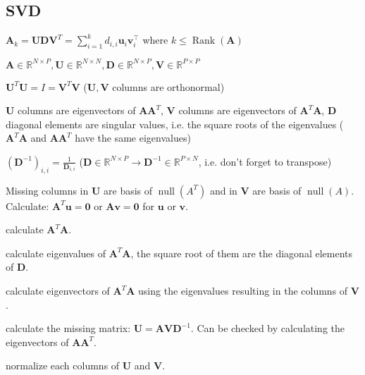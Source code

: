 \documentclass[a4paper, 11pt, landscape]{article}
\begin{document}
\begin{multicols*}{3}
\section{SVD}
\begin{compactitem}
	\item $\mathbf{A}_k = \mathbf{U} \mathbf{D} \mathbf{V}^T = \sum_{i=1}^{k} d_{i,i} \mathbf{u}_i \mathbf{v}_i^\top$ where $k \leq \operatorname{Rank}(\mathbf{A})$
	\item $\mathbf{A} \in \mathbb{R}^{N \times P}, \mathbf{U} \in \mathbb{R}^{N \times N}, \mathbf{D} \in \mathbb{R}^{N \times P}, \mathbf{V} \in \mathbb{R}^{P \times P}$
	\item $\mathbf{U}^T \mathbf{U} = I = \mathbf{V}^T \mathbf{V}$ ($\mathbf{U}, \mathbf{V}$ columns are orthonormal)
	\item $\mathbf{U}$ columns are eigenvectors of $\mathbf{A} \mathbf{A}^T$, $\mathbf{V}$ columns are eigenvectors of $\mathbf{A}^T \mathbf{A}$, $\mathbf{D}$ diagonal elements are singular values, i.e. the square roots of the eigenvalues ($\mathbf{A}^T \mathbf{A}$ and $\mathbf{A} \mathbf{A}^T$ have the same eigenvalues)
	\item $(\mathbf{D}^{-1})_{i,i} = \frac{1}{\mathbf{D}_{i, i}}$ ($\mathbf{D} \in \mathbb{R}^{N \times P} \to \mathbf{D}^{-1} \in \mathbb{R}^{P \times N}$, i.e. don't forget to transpose)
	\item Missing columns in $\mathbf{U}$ are basis of $\operatorname{null}(A^T)$ and in $\mathbf{V}$ are basis of $\operatorname{null}(A)$. Calculate: $\mathbf{A}^T \mathbf{u} = \mathbf{0}$ or $\mathbf{A} \mathbf{v} = \mathbf{0}$ for $\mathbf{u}$ or $\mathbf{v}$.
\end{compactitem}

\begin{compactenum}
	\item calculate $\mathbf{A}^T \mathbf{A}$.
	\item calculate eigenvalues of $\mathbf{A}^T \mathbf{A}$, the square root of them are the diagonal elements of $\mathbf{D}$.
	\item calculate eigenvectors of $\mathbf{A}^T \mathbf{A}$ using the eigenvalues resulting in the columns of $\mathbf{V}$.
	\item calculate the missing matrix: $\mathbf{U} = \mathbf{A} \mathbf{V} \mathbf{D}^{-1}$. Can be checked by calculating the eigenvectors of $\mathbf{A} \mathbf{A}^T$.
	\item normalize each columns of $\mathbf{U}$ and $\mathbf{V}$.
\end{compactenum}


\end{multicols*}
\end{document}
